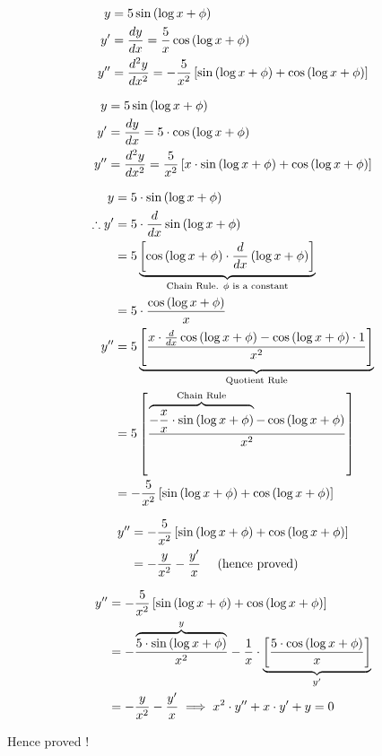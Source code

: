 \documentclass[14pt,fleqn]{extarticle}
\begin{document}
\newcard 

\begin{align}
y &= 5 \sin \left( \log x + \phi \right) \\ 
y' &= \frac{dy}{dx} = \frac{5}{x} \cos \left( \log x + \phi \right) \\
y'' &= \frac{d^2 y}{dx^2} = -\frac{5}{x^2} \left[ \sin \left( \log x + \phi \right) + \cos \left( \log x + \phi \right) \right]
\end{align}

\newcard 

\begin{align}
y &= 5 \sin \left( \log x + \phi \right) \\ 
y' &= \frac{dy}{dx} = 5\cdot\cos \left( \log x + \phi \right) \\ 
y'' &= \frac{d^2 y}{dx^2} = \frac{5}{x^2} \left[x\cdot\sin \left( \log x + \phi \right) + \cos \left( \log x + \phi \right) \right]
\end{align}


\newcard 

\begin{align}
y &= 5 \cdot \sin \left( \log x + \phi \right) \\
\therefore y' &= 5\cdot\frac{d}{dx}\sin \left( \log x + \phi \right) \\
&= 5 \underbrace{\left[\cos \left( \log x + \phi \right)\cdot \frac{d}{dx} \left(\log x + \phi \right) \right]}_{\text{Chain Rule. $\phi$ is a constant}} \\ 
&= 5\cdot \frac{\cos \left( \log x + \phi \right)}{x} \\
y'' &= 5 \underbrace{\left[ \dfrac{x\cdot \frac{d}{dx}\cos \left( \log x + \phi \right) - \cos \left( \log x + \phi \right)\cdot 1}{x^2}\right]}_{\text{Quotient Rule}} \\
&= 5 \left[ \frac{\overbrace{-\frac{x}{x}\cdot \sin \left( \log x + \phi \right)}^{\text{Chain Rule}} -\cos \left( \log x + \phi \right)}{x^2}\right] \\
&= -\frac{5}{x^2} \left[\sin \left( \log x + \phi \right) + \cos \left( \log x + \phi \right) \right]
\end{align}

\newcard 

\begin{align}
y'' &= 	-\frac{5}{x^2} \left[\sin \left( \log x + \phi \right) + \cos \left( \log x + \phi \right) \right] \\
&= -\frac{y}{x^2} - \frac{y'}{x}  \quad\text{ (hence proved) }
\end{align}

\newcard 
\begin{align}
y'' &= 	-\frac{5}{x^2} \left[\sin \left( \log x + \phi \right) + \cos \left( \log x + \phi \right) \right] \\
&= -\frac{\overbrace{5\cdot\sin \left( \log x + \phi \right)}^{ y}}{x^2} -\frac{1}{x}\cdot \underbrace{\left[ \frac{5\cdot\cos \left( \log x + \phi \right)}{x}\right]}_{y'} \\
&= -\frac{y}{x^2} -\frac{y'}{x} \implies x^2\cdot y'' + x\cdot y' + y = 0
\end{align}

Hence proved !
\end{document}
